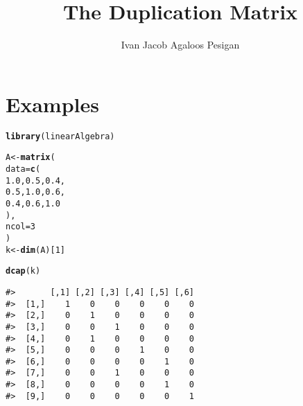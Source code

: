 \documentclass{article}\usepackage[]{graphicx}\usepackage[]{color}
\title{The Duplication Matrix}
\author{Ivan Jacob Agaloos Pesigan}
\date{}
\makeatletter
\newcommand{\hlnum}[1]{\textcolor[rgb]{0.686,0.059,0.569}{#1}}%
\newcommand{\hlstd}[1]{\textcolor[rgb]{0.345,0.345,0.345}{#1}}%
\newcommand{\hlkwb}[1]{\textcolor[rgb]{0.69,0.353,0.396}{#1}}%
\newcommand{\hlkwc}[1]{\textcolor[rgb]{0.333,0.667,0.333}{#1}}%
\newcommand{\hlkwd}[1]{\textcolor[rgb]{0.737,0.353,0.396}{\textbf{#1}}}%
\newenvironment{kframe}{%
 \def\at@end@of@kframe{}%
 \ifinner\ifhmode%
  \def\at@end@of@kframe{\end{minipage}}%
  \begin{minipage}{\columnwidth}%
 \fi\fi%
 \def\FrameCommand##1{\hskip\@totalleftmargin \hskip-\fboxsep
 \colorbox{shadecolor}{##1}\hskip-\fboxsep
     \hskip-\linewidth \hskip-\@totalleftmargin \hskip\columnwidth}%
 \MakeFramed {\advance\hsize-\width
   \@totalleftmargin\z@ \linewidth\hsize
   \@setminipage}}%
 {\par\unskip\endMakeFramed%
 \at@end@of@kframe}
\newenvironment{knitrout}{}{} %
\makeatother
\begin{document}
\maketitle











\newpage

\section*{Examples}

\begin{knitrout}
\color{fgcolor}\begin{kframe}
\begin{alltt}
\hlkwd{library}\hlstd{(linearAlgebra)}
\end{alltt}
\end{kframe}
\end{knitrout}

\begin{knitrout}
\color{fgcolor}\begin{kframe}
\begin{alltt}
\hlstd{A} \hlkwb{<-} \hlkwd{matrix}\hlstd{(}
  \hlkwc{data} \hlstd{=} \hlkwd{c}\hlstd{(}
    \hlnum{1.0}\hlstd{,} \hlnum{0.5}\hlstd{,} \hlnum{0.4}\hlstd{,}
    \hlnum{0.5}\hlstd{,} \hlnum{1.0}\hlstd{,} \hlnum{0.6}\hlstd{,}
    \hlnum{0.4}\hlstd{,} \hlnum{0.6}\hlstd{,} \hlnum{1.0}
  \hlstd{),}
  \hlkwc{ncol} \hlstd{=} \hlnum{3}
\hlstd{)}
\hlstd{k} \hlkwb{<-} \hlkwd{dim}\hlstd{(A)[}\hlnum{1}\hlstd{]}
\end{alltt}
\end{kframe}
\end{knitrout}

\begin{knitrout}
\color{fgcolor}\begin{kframe}
\begin{alltt}
\hlkwd{dcap}\hlstd{(k)}
\end{alltt}
\begin{verbatim}
#>       [,1] [,2] [,3] [,4] [,5] [,6]
#>  [1,]    1    0    0    0    0    0
#>  [2,]    0    1    0    0    0    0
#>  [3,]    0    0    1    0    0    0
#>  [4,]    0    1    0    0    0    0
#>  [5,]    0    0    0    1    0    0
#>  [6,]    0    0    0    0    1    0
#>  [7,]    0    0    1    0    0    0
#>  [8,]    0    0    0    0    1    0
#>  [9,]    0    0    0    0    0    1
\end{verbatim}
\end{kframe}
\end{knitrout}
\end{document}
